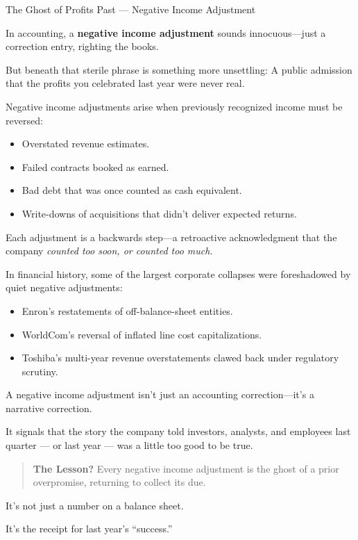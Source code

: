 \begin{HistoricalSidebar}{The Ghost of Profits Past --- Negative Income Adjustment}
  
  In accounting, a \textbf{negative income adjustment} sounds innocuous—just a correction entry, righting the books.
  
  \medskip
  
  But beneath that sterile phrase is something more unsettling:  
  A public admission that the profits you celebrated last year were never real.
  
  \medskip
  
  Negative income adjustments arise when previously recognized income must be reversed:
  \begin{itemize}
      \item Overstated revenue estimates.
      \item Failed contracts booked as earned.
      \item Bad debt that was once counted as cash equivalent.
      \item Write-downs of acquisitions that didn’t deliver expected returns.
  \end{itemize}
  
  Each adjustment is a backwards step—a retroactive acknowledgment that the company \textit{counted too soon, or counted too much}.
  
  \medskip
  
  In financial history, some of the largest corporate collapses were foreshadowed by quiet negative adjustments:
  
  \medskip
  
  \begin{itemize}
      \item Enron’s restatements of off-balance-sheet entities.
      \item WorldCom’s reversal of inflated line cost capitalizations.
      \item Toshiba’s multi-year revenue overstatements clawed back under regulatory scrutiny.
  \end{itemize}
  
  \medskip
  
  A negative income adjustment isn’t just an accounting correction—it’s a narrative correction.
  
  \medskip
  
  It signals that the story the company told investors, analysts, and employees last quarter --- or last year --- was a little too good to be true.
  
  \medskip
  
  \begin{quote}
  \textbf{The Lesson?} Every negative income adjustment is the ghost of a prior overpromise, returning to collect its due.
  \end{quote}
  
  It’s not just a number on a balance sheet.  
  
  \medskip
  
  It’s the receipt for last year’s “success.”
  
\end{HistoricalSidebar}

